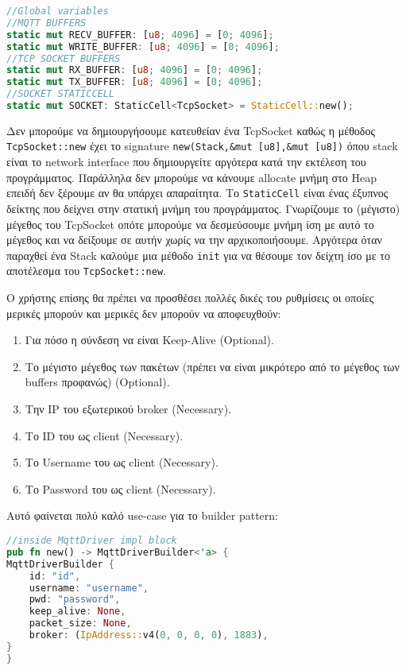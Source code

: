 \begin{lstlisting}[language=Rust]
//Global variables
//MQTT BUFFERS
static mut RECV_BUFFER: [u8; 4096] = [0; 4096];
static mut WRITE_BUFFER: [u8; 4096] = [0; 4096];
//TCP SOCKET BUFFERS
static mut RX_BUFFER: [u8; 4096] = [0; 4096];
static mut TX_BUFFER: [u8; 4096] = [0; 4096];
//SOCKET STATICCELL
static mut SOCKET: StaticCell<TcpSocket> = StaticCell::new();
\end{lstlisting}

Δεν μπορούμε να δημιουργήσουμε κατευθείαν ένα TcpSocket καθώς η
μέθοδος \verb|TcpSocket::new| έχει το signature
\verb|new(Stack,&mut [u8],&mut [u8])| όπου stack είναι το network
interface που δημιουργείτε αργότερα κατά την εκτέλεση του
προγράμματος. Παράλληλα δεν μπορούμε να κάνουμε allocate μνήμη στο
Heap επειδή δεν ξέρουμε αν θα υπάρχει απαραίτητα. Το \verb|StaticCell|
είναι ένας έξυπνος δείκτης που δείχνει στην στατική μνήμη του
προγράμματος. Γνωρίζουμε το (μέγιστο) μέγεθος του TcpSocket οπότε
μπορούμε να δεσμεύσουμε μνήμη ίση με αυτό το μέγεθος και να δείξουμε
σε αυτήν χωρίς να την αρχικοποιήσουμε. Αργότερα όταν παραχθεί ένα
Stack καλούμε μια μέθοδο \verb|init| για να θέσουμε τον δείχτη
ίσο με το αποτέλεσμα του \verb|TcpSocket::new|.

Ο χρήστης επίσης θα πρέπει να προσθέσει πολλές δικές του ρυθμίσεις
οι οποίες μερικές μπορούν και μερικές δεν μπορούν να αποφευχθούν:

\begin{enumerate}
\item Για πόσο η σύνδεση να είναι Keep-Alive (Optional).
\item Το μέγιστο μέγεθος των πακέτων (πρέπει να είναι μικρότερο από το μέγεθος των buffers προφανώς) (Optional).
\item Την IP του εξωτερικού broker (Necessary).
\item Το ID του ως client (Necessary).
\item Το Username του ως client (Necessary).
\item Το Password του ως client (Necessary).
\end{enumerate}

Αυτό φαίνεται πολύ καλό use-case για το builder pattern:

\begin{lstlisting}[language=Rust]
//inside MqttDriver impl block
pub fn new() -> MqttDriverBuilder<'a> {
MqttDriverBuilder {
    id: "id",
    username: "username",
    pwd: "password",
    keep_alive: None,
    packet_size: None,
    broker: (IpAddress::v4(0, 0, 0, 0), 1883),
}
}
\end{lstlisting}

